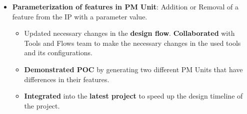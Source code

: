 \documentclass[a4paper,11pt]{article}
\newcommand{\isep}{-2 pt}
\begin{document}
\begin{itemize}
\begin{itemize}
			\item \textbf{Parameterization of features in PM Unit}: Addition or Removal of a feature from the IP with a parameter value.
			\begin{itemize} \itemsep \isep
				\item Updated necessary changes in the \textbf{design flow}. \textbf{Collaborated} with Tools and Flows team to make the necessary changes in the used tools and its configurations.
				\item \textbf{Demonstrated POC} by generating two different PM Units that have differences in their features.
				\item \textbf{Integrated} into the \textbf{latest project} to speed up the design timeline of the project.
			\end{itemize}
		\end{itemize}


\end{itemize}
\end{document}
